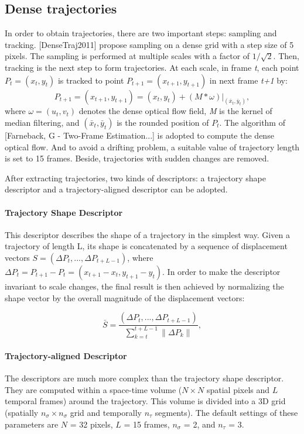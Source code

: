 \documentclass[review]{elsarticle}
\begin{document}
\subsection{Dense trajectories}
In order to obtain trajectories, there are two important steps: sampling and tracking. [DenseTraj2011] propose sampling on a dense grid with a step size of 5 pixels. The sampling is performed at multiple scales with a factor of $1/\sqrt{2}$. Then, tracking is the next step to form trajectories. At each scale, in frame \textit{t}, each point \textit{$P_t = (x_t, y_t)$} is tracked to point \textit{$P_{t+1} = (x_{t+1}, y_{t+1})$} in next frame \textit{t+1} by:
\begin{equation}
	\textit{$P_{t+1} = (x_{t+1}, y_{t+1}) = (x_t, y_t) + (M*\omega)|_{(\bar{x}_t,\bar{y}_t)} $},
\end{equation}
where \textit{$\omega = (u_t, v_t)$} denotes the dense optical flow field, \textit{M} is the kernel of median filtering, and \textit{$(\bar{x}_t,\bar{y}_t)$} is the rounded position of \textit{$P_t$}. The algorithm of [Farneback, G - Two-Frame Estimation...] is adopted to compute the dense optical flow. And to avoid a drifting problem, a suitable value of trajectory length is set to 15 frames. Beside, trajectories with sudden changes are removed.

After extracting trajectories, two kinds of descriptors: a trajectory shape descriptor and a trajectory-aligned descriptor can be adopted.

\paragraph{Trajectory Shape Descriptor}This descriptor describes the shape of a trajectory in the simplest way. Given a trajectory of length L, its shape is concatenated by a sequence of displacement vectors \textit{$S = (\Delta P_t, ..., \Delta P_{t+L-1})$}, where \textit{$\Delta P_t = P_{t+1} - P_t = (x_{t+1} - x_t, y_{t+1} - y_t)$}. In order to make the descriptor invariant to scale changes, the final result is then achieved by normalizing the shape vector by the overall magnitude of the displacement vectors:

\begin{equation}
	\textit{$\bar{S} = \frac{(\Delta P_t, ..., \Delta P_{t+L-1})}{\sum_{k=t}^{t+L-1}\|\Delta P_k\|}$},
\end{equation}

\paragraph{Trajectory-aligned Descriptor}The descriptors are much more complex than the trajectory shape descriptor. They are computed within a space-time volume ($N \times N$ spatial pixels and $L$ temporal frames) around the trajectory. This volume is divided into a 3D grid (spatially $n_\sigma \times n_\sigma$ grid and temporally $n_\tau$ segments). The default settings of these parameters are $N$ = 32 pixels, $L$ = 15 frames, $n_\sigma$ = 2, and $n_\tau$ = 3.
\end{document}
